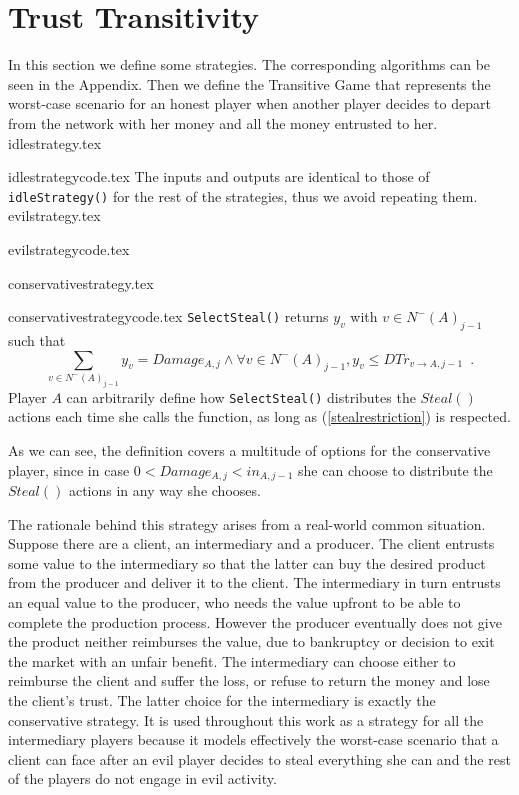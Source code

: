 \section{Trust Transitivity}
   In this section we define some strategies. The corresponding algorithms can be seen in the Appendix. Then we define the
   Transitive Game that represents the worst-case scenario for an honest player when another player decides to depart from
   the network with her money and all the money entrusted to her.
   {idlestrategy.tex}

   {idlestrategycode.tex}
   The inputs and outputs are identical to those of \texttt{idleStrategy()} for the rest of the strategies, thus we avoid
   repeating them.
   {evilstrategy.tex}

   {evilstrategycode.tex}

   {conservativestrategy.tex}

   {conservativestrategycode.tex}
   \texttt{SelectSteal()} returns $y_v$ with $v \in N^{-}\left(A\right)_{j-1}$ such that
   \begin{equation}
   \label{stealrestriction}
      \sum\limits_{v \in N^{-}\left(A\right)_{j-1}}y_v = Damage_{A, j} \wedge \forall v \in N^{-}\left(A\right)_{j-1},
      y_v \leq DTr_{v \rightarrow A, j-1} \enspace.
   \end{equation}
   Player $A$ can arbitrarily define how \texttt{SelectSteal()} distributes the $Steal\left(\right)$ actions
   each time she calls the function, as long as (\ref{stealrestriction}) is respected. 

   As we can see, the definition covers a multitude of options for the conservative player, since in case $0 < Damage_{A,j}
   < in_{A,j-1}$ she can choose to distribute the $Steal\left(\right)$ actions in any way she chooses.

   The rationale behind this strategy arises from a real-world common situation. Suppose there are a client, an
   intermediary and a producer. The client entrusts some value to the intermediary so that the latter can buy the desired
   product from the producer and deliver it to the client. The intermediary in turn entrusts an equal value to the
   producer, who needs the value upfront to be able to complete the production process. However the producer eventually
   does not give the product neither reimburses the value, due to bankruptcy or decision to exit the market with an unfair
   benefit. The intermediary can choose either to reimburse the client and suffer the loss, or refuse to return the money
   and lose the client's trust. The latter choice for the intermediary is exactly the conservative strategy. It is used
   throughout this work as a strategy for all the intermediary players because it models effectively the worst-case
   scenario that a client can face after an evil player decides to steal everything she can and the rest of the players do
   not engage in evil activity.

